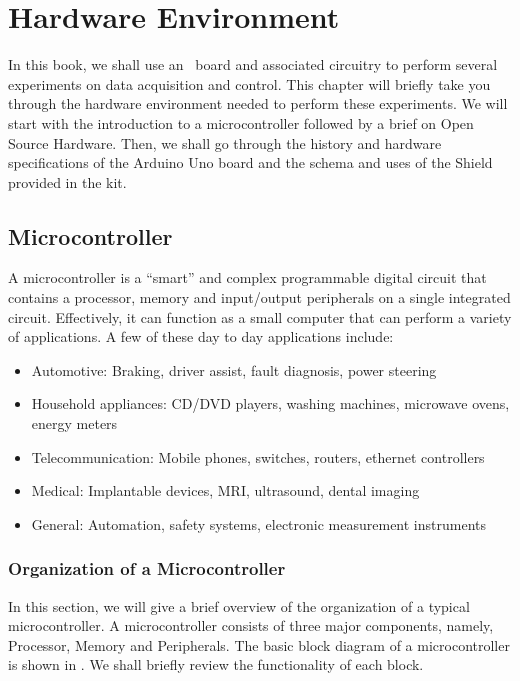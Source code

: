 \chapter{Hardware Environment}
\thispagestyle{empty}
\label{sec:hw-env}
\newcommand{\LocHWfig}{\Origin/user-code/hw-env/figures}
\newcommand{\LocHWscicode}{\Origin/user-code/hw-env/scilab}
\newcommand{\LocHWscibrief}{Origin/user-code/hw-env/scilab}
\newcommand{\LocHWardcode}{\Origin/user-code/hw-env/arduino}
\newcommand{\LocHWardbrief}{\tt Origin/user-code/hw-env/arduino}
\newcommand{\LocSH}{\Origin/tools/shield}
\newcommand{\LocSHbrief}[1]{{\tt Origin/tools/shield/#1}, see \fnrefp{fn:file-loc}}

In this book, we shall use an \arduino\ board and associated circuitry
to perform several experiments on data acquisition and control. This
chapter will briefly take you through the hardware environment needed
to perform these experiments. We will start with the introduction to a
microcontroller followed by a brief on Open Source Hardware. Then, we
shall go through the history and hardware specifications of the
Arduino Uno board and the schema and uses of the Shield provided in
the kit.


\section{Microcontroller}
A microcontroller is a ``smart'' and complex programmable digital circuit
that contains a processor, memory and input/output peripherals on a
single integrated circuit. Effectively, it can function as a small
computer that can perform a variety of applications. A few of these
day to day applications include:
\begin{itemize}
\item Automotive: Braking, driver assist, fault diagnosis, power
  steering
\item Household appliances: CD/DVD players, washing machines,
  microwave ovens, energy meters
\item Telecommunication: Mobile phones, switches, routers, ethernet
  controllers
\item Medical: Implantable devices, MRI, ultrasound, dental imaging
\item General: Automation, safety systems, electronic measurement
  instruments
\end{itemize}

\subsection{Organization of a Microcontroller}
In this section, we will give a brief overview of the organization of
a typical microcontroller.  A microcontroller consists of three major
components, namely, Processor, Memory and Peripherals. The basic block
diagram of a microcontroller is shown in . We shall
briefly review the functionality of each block.

